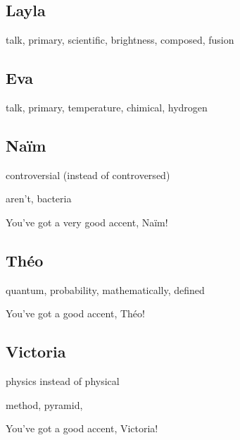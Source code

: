 \documentclass[12pt,oneside]{report}
\begin{document}
\begin{spacing}{1.2}
\subsection*{Layla}

talk, primary, scientific, brightness, composed, fusion

\subsection*{Eva}

talk, primary, temperature, chimical, hydrogen

\subsection*{Naïm}

controversial (instead of controversed)

aren't, bacteria

You've got a very good accent, Naïm!


\subsection*{Théo}


quantum, probability, mathematically, defined

You've got a good accent, Théo!


\subsection*{Victoria}

physics instead of physical

method, pyramid, 

You've got a good accent, Victoria!

\end{spacing}
\end{document}
